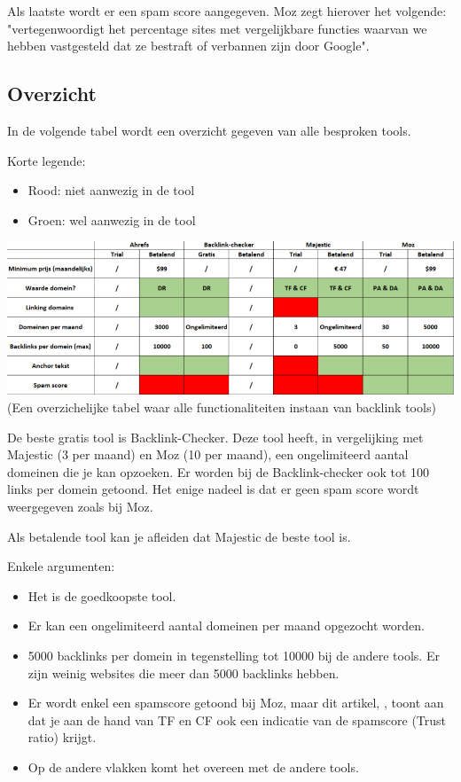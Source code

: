 Als laatste wordt er een spam score aangegeven. Moz zegt hierover het volgende: "vertegenwoordigt het percentage sites met vergelijkbare functies waarvan we hebben vastgesteld dat ze bestraft of verbannen zijn door Google".

\subsection{Overzicht}
\label{ch: Overzicht}

In de volgende tabel wordt een overzicht gegeven van alle besproken tools. 

Korte legende: 
\begin{itemize}
\item Rood: niet aanwezig in de tool
\item Groen: wel aanwezig in de tool
\end{itemize}

\includegraphics[width=\linewidth]{Bachelorproef/bachelor/img/linkbuildingtabel.PNG}
(Een overzichelijke tabel waar alle functionaliteiten instaan van backlink tools)

De beste gratis tool is Backlink-Checker. Deze tool heeft, in vergelijking met Majestic (3 per maand) en Moz (10 per maand), een ongelimiteerd aantal domeinen die je kan opzoeken. Er worden bij de Backlink-checker ook tot 100 links per domein getoond. Het enige nadeel is dat er geen spam score wordt weergegeven zoals bij Moz. 

Als betalende tool kan je afleiden dat Majestic de beste tool is.

Enkele argumenten: 
\begin{itemize}
\item Het is de goedkoopste tool.
\item Er kan een ongelimiteerd aantal domeinen per maand opgezocht worden. 
\item 5000 backlinks per domein in tegenstelling tot 10000 bij de andere tools. Er zijn weinig websites die meer dan 5000 backlinks hebben.
\item Er wordt enkel een spamscore getoond bij Moz, maar dit artikel, \textcite{MAJESTIC} , toont aan dat je aan de hand van TF en CF ook een indicatie van de spamscore (Trust ratio) krijgt. 
\item Op de andere vlakken komt het overeen met de andere tools.
\end{itemize}

